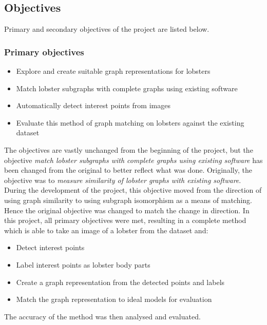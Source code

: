 \subsection{Objectives}
Primary and secondary objectives of the project are listed below.
\subsubsection{Primary objectives}
\begin{itemize}
\item Explore and create suitable graph representations for lobsters
\item Match lobster subgraphs with complete graphs using existing software
\item Automatically detect interest points from images
\item Evaluate this method of graph matching on lobsters against the existing dataset
\end{itemize}
The objectives are vastly unchanged from the beginning of the project, but the objective \textit{match lobster subgraphs with complete graphs using existing software} has been changed from the original to better reflect what was done. Originally, the objective was to \textit{measure similarity of lobster graphs with existing software}. During the development of the project, this objective moved from the direction of using graph similarity to using subgraph isomorphism as a means of matching. Hence the original objective was changed to match the change in direction. 
\n
In this project, all primary objectives were met, resulting in a complete method which is able to take an image of a lobster from the dataset and:
\begin{itemize}
\item Detect interest points
\item Label interest points as lobster body parts
\item Create a graph representation from the detected points and labels
\item Match the graph representation to ideal models for evaluation
\end{itemize} 
The accuracy of the method was then analysed and evaluated. 
 
